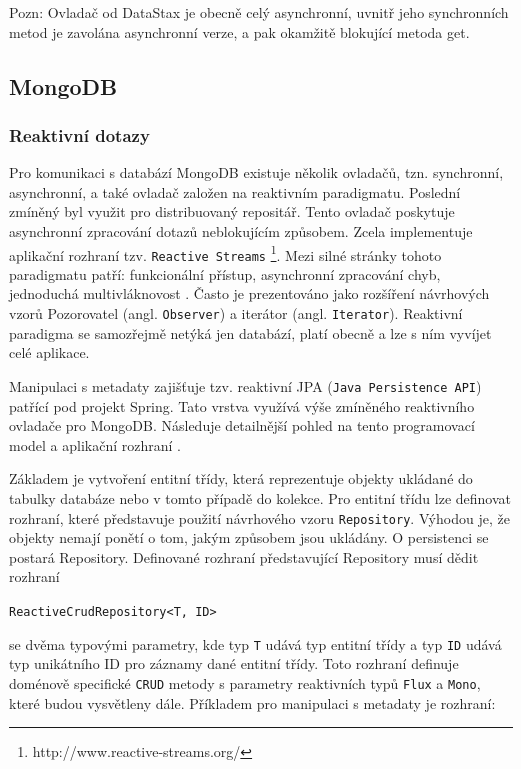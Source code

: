Pozn: Ovladač od DataStax je obecně celý asynchronní, uvnitř jeho synchronních metod je zavolána asynchronní verze, a pak okamžitě blokující metoda get.

\subsection{MongoDB}

\subsubsection{Reaktivní dotazy}
Pro komunikaci s databází MongoDB existuje několik ovladačů, tzn. synchronní, asynchronní, a také ovladač založen na reaktivním paradigmatu. Poslední zmíněný byl využit pro distribuovaný repositář. Tento ovladač poskytuje asynchronní zpracování dotazů neblokujícím způsobem. Zcela implementuje aplikační rozhraní tzv. \texttt{Reactive Streams} \footnote{http://www.reactive-streams.org/}. Mezi silné stránky tohoto paradigmatu patří: funkcionální přístup, asynchronní zpracování chyb, jednoduchá multivláknovost \cite{oficReactiveX}. Často je prezentováno jako rozšíření návrhových vzorů Pozorovatel (angl. \texttt{Observer}) a iterátor (angl. \texttt{Iterator}). Reaktivní paradigma se samozřejmě netýká jen databází, platí obecně a lze s ním vyvíjet celé aplikace.


Manipulaci s metadaty zajišťuje tzv. reaktivní JPA (\texttt{Java Persistence API}) patřící pod projekt Spring. Tato vrstva využívá výše zmíněného reaktivního ovladače pro MongoDB. Následuje detailnější pohled na tento programovací model a aplikační rozhraní \cite{springDataReactive}.

Základem je vytvoření entitní třídy, která reprezentuje objekty ukládané do tabulky databáze nebo v tomto případě do kolekce. Pro entitní třídu lze definovat rozhraní, které představuje použití návrhového vzoru \texttt{Repository}. Výhodou je, že objekty nemají ponětí o tom, jakým způsobem jsou ukládány. O persistenci se postará Repository. Definované rozhraní představující Repository musí dědit rozhraní

\vspace{0.5cm}
\texttt{ReactiveCrudRepository<T, ID>}

\vspace{0.5cm}
\noindent se dvěma typovými parametry, kde typ \texttt{T} udává typ entitní třídy a typ \texttt{ID} udává typ unikátního ID pro záznamy dané entitní třídy. Toto rozhraní definuje doménově specifické \texttt{CRUD} metody s parametry reaktivních typů \texttt{Flux} a \texttt{Mono}, které budou vysvětleny dále. Příkladem pro manipulaci s metadaty je rozhraní:

